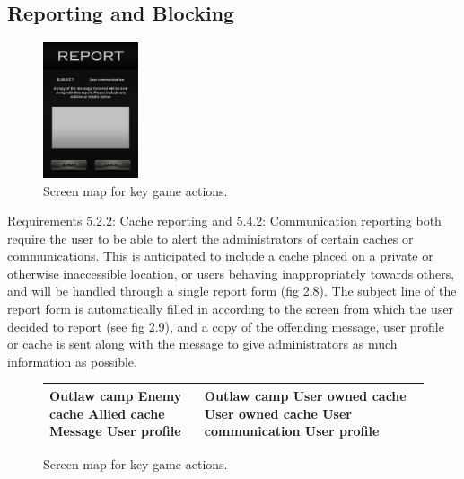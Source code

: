 \subsection{Reporting and Blocking}
\begin{figure}
	\vspace{-20pt}
	\begin{center}
	\includegraphics[width=0.25\textwidth]{images/report_mockup}
	\caption{Screen map for key game actions.}
	\end{center}
	\vspace{-20pt}
\end{figure}
Requirements 5.2.2: Cache reporting and 5.4.2: Communication reporting both require the user to be able to alert the administrators of certain caches or communications. This is anticipated to include a cache placed on a private or otherwise inaccessible location, or users behaving inappropriately towards others, and will be handled through a single report form (fig 2.8). The subject line of the report form is automatically filled in according to the screen from which the user decided to report (see fig 2.9), and a copy of the offending message, user profile or cache is sent along with the message to give administrators as much information as possible.

\begin{figure}
	\vspace{-20pt}
	\begin{center}
	\begin{tabular}{| p{} | p{} |}
		\hline
		Outlaw camp
Enemy cache
Allied cache
Message
User profile
 &
		Outlaw camp
User owned cache
User owned cache
User communication
User profile
 \\
		\hline
	\end{tabular}
	\caption{Screen map for key game actions.}
	\end{center}
	\vspace{-20pt}
\end{figure}

